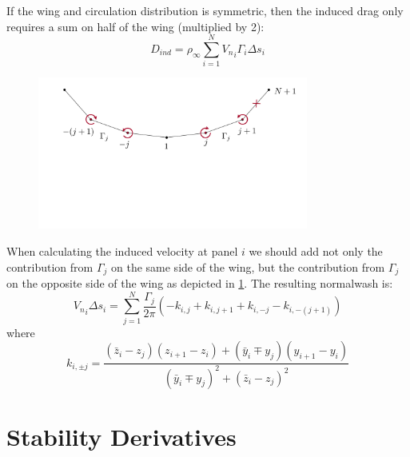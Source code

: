 \documentclass{article}
\begin{document}
If the wing and circulation distribution is symmetric, then the induced drag only requires a sum on half of the wing (multiplied by 2):
\begin{equation}
D_{ind} = \rho_\infty \sum_{i=1}^N {V_n}_i \Gamma_i  \Delta s_i
\end{equation}


\begin{figure}[htbp]
\centering
\includegraphics[width=3.5in]{figs/induced2}
\caption{}
\label{fig:induced2}
\end{figure}

When calculating the induced velocity at panel $i$ we should add not only the contribution from $\Gamma_j$ on the same side of the wing, but the contribution from $\Gamma_j$ on the opposite side of the wing as depicted in \cref{fig:induced2}.  The resulting normalwash is:
\begin{equation}
{V_n}_i \Delta s_i = \sum_{j=1}^N 
\frac{\Gamma_j}{2\pi} \left( 
-k_{i,j} + k_{i, j+1} + k_{i, -j} - k_{i, -(j+1)}
\right)
\end{equation}
where
\begin{equation}
k_{i,\pm j} = \frac{(\bar z_i - z_j) (z_{i+1} - z_i) + (\bar y_i \mp y_j) (y_{i+1} - y_i)}{(\bar y_i \mp y_j)^2 + (\bar z_i - z_j)^2} 
\end{equation}





\section{Stability Derivatives}
\end{document}
